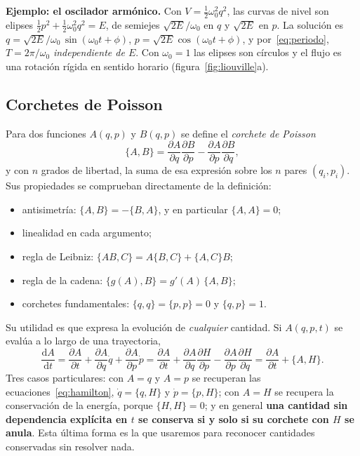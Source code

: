 \documentclass[11pt,a4paper]{article}
\newcommand{\dd}{\mathrm{d}}
\theoremstyle{definition}
\begin{document}
\begin{idea}
\textbf{Ejemplo: el oscilador armónico.} Con $V=\tfrac12\omega_0^2q^2$, las curvas de
nivel son elipses $\tfrac12p^2+\tfrac12\omega_0^2q^2=E$, de semiejes
$\sqrt{2E}/\omega_0$ en $q$ y $\sqrt{2E}$ en $p$. La solución es
$q=\sqrt{2E}/\omega_0\,\sin(\omega_0t+\phi)$, $p=\sqrt{2E}\cos(\omega_0t+\phi)$, y
por~\eqref{eq:periodo}, $T=2\pi/\omega_0$ \emph{independiente de $E$}. Con
$\omega_0=1$ las elipses son círculos y el flujo es una rotación rígida en sentido
horario (figura~\ref{fig:liouville}a).
\end{idea}

\subsection{Corchetes de Poisson}

Para dos funciones $A(q,p)$ y $B(q,p)$ se define el \emph{corchete de Poisson}
\begin{equation}
  \{A,B\} = \frac{\partial A}{\partial q}\frac{\partial B}{\partial p}
           -\frac{\partial A}{\partial p}\frac{\partial B}{\partial q} ,
  \label{eq:corchete}
\end{equation}
y con $n$ grados de libertad, la suma de esa expresión sobre los $n$ pares
$(q_i,p_i)$. Sus propiedades se comprueban directamente de la definición:
\begin{itemize}
  \item antisimetría: $\{A,B\}=-\{B,A\}$, y en particular $\{A,A\}=0$;
  \item linealidad en cada argumento;
  \item regla de Leibniz: $\{AB,C\}=A\{B,C\}+\{A,C\}B$;
  \item regla de la cadena: $\{g(A),B\}=g'(A)\,\{A,B\}$;
  \item corchetes fundamentales: $\{q,q\}=\{p,p\}=0$ y $\{q,p\}=1$.
\end{itemize}

Su utilidad es que expresa la evolución de \emph{cualquier} cantidad. Si $A(q,p,t)$
se evalúa a lo largo de una trayectoria,
\begin{equation}
  \frac{\dd A}{\dd t}
  = \frac{\partial A}{\partial t}
  + \frac{\partial A}{\partial q}\dot q + \frac{\partial A}{\partial p}\dot p
  = \frac{\partial A}{\partial t}
  + \frac{\partial A}{\partial q}\frac{\partial H}{\partial p}
  - \frac{\partial A}{\partial p}\frac{\partial H}{\partial q}
  = \frac{\partial A}{\partial t} + \{A,H\} .
  \label{eq:evolucion}
\end{equation}
Tres casos particulares: con $A=q$ y $A=p$ se recuperan las
ecuaciones~\eqref{eq:hamilton}, $\dot q=\{q,H\}$ y $\dot p=\{p,H\}$; con $A=H$ se
recupera la conservación de la energía, porque $\{H,H\}=0$; y en general
\textbf{una cantidad sin dependencia explícita en $t$ se conserva si y solo si su
corchete con $H$ se anula}. Esta última forma es la que usaremos para reconocer
cantidades conservadas sin resolver nada.
\end{document}

